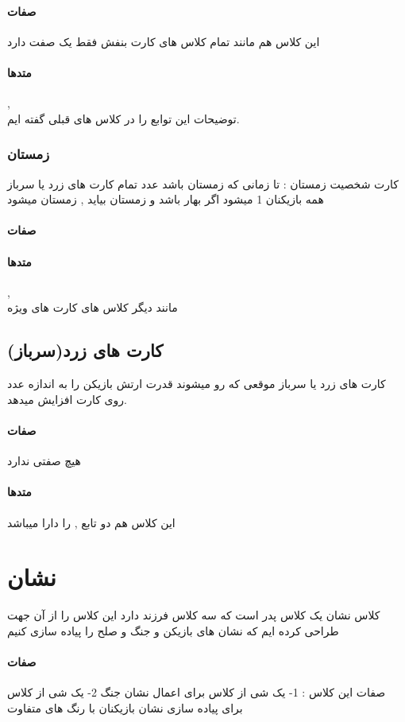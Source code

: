 \documentclass[pdf,titlepage,a4paper]{report}
\begin{document}
	\paragraph{صفات}
	این کلاس هم مانند تمام کلاس های کارت بنفش فقط یک صفت  دارد
	\paragraph{متدها}
	 ,  \\
	توضیحات این توابع را در کلاس های قبلی گفته ایم.

	\subsubsection{زمستان}
	کارت شخصیت زمستان : تا زمانی که زمستان باشد عدد تمام کارت های زرد یا سرباز همه بازیکنان 1 میشود اگر بهار باشد و زمستان بیاید , زمستان میشود
	\paragraph{صفات}
	\paragraph{متدها}
	 ,  \\
	مانند دیگر کلاس های کارت های ویژه

	\subsection{کارت های زرد(سرباز)}
	کارت های زرد یا سرباز موقعی که رو میشوند قدرت ارتش بازیکن را به اندازه عدد روی کارت افزایش میدهد.

	\paragraph{صفات}
	هیچ صفتی ندارد 
	\paragraph{متدها}
	این کلاس هم دو تابع  ,  را دارا میباشد
	\newpage
	
	\section{نشان}
	کلاس نشان یک کلاس پدر است که سه کلاس فرزند دارد این کلاس را از آن جهت طراحی کرده ایم که نشان های بازیکن و جنگ و صلح را پیاده سازی کنیم
	\paragraph{صفات}
     صفات این کلاس :
	 1- یک شی از کلاس   برای اعمال نشان جنگ
	 2- یک شی از کلاس  برای پیاده سازی نشان بازیکنان با رنگ های متفاوت
\end{document}
